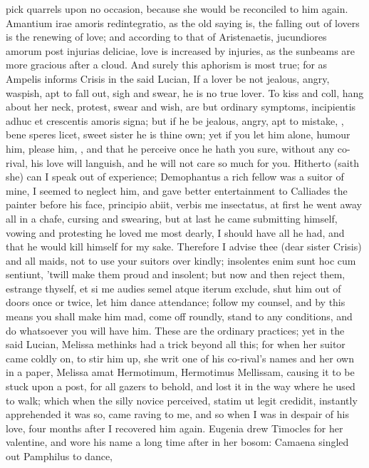 pick quarrels upon no occasion, because she would be reconciled to him
again. Amantium irae amoris redintegratio, as the old saying is, the
falling out of lovers is the renewing of love; and according to that of
Aristenaetis, jucundiores amorum post injurias deliciae, love is
increased by injuries, as the sunbeams are more gracious after a cloud.
And surely this aphorism is most true; for as Ampelis informs Crisis in
the said Lucian, If a lover be not jealous, angry, waspish, apt
to fall out, sigh and swear, he is no true lover. To kiss and coll,
hang about her neck, protest, swear and wish, are but ordinary
symptoms, incipientis adhuc et crescentis amoris signa; but if he be
jealous, angry, apt to mistake, \etc{}, bene speres licet, sweet sister he
is thine own; yet if you let him alone, humour him, please him, \etc{},
and that he perceive once he hath you sure, without any co-rival, his
love will languish, and he will not care so much for you. Hitherto
(saith she) can I speak out of experience; Demophantus a rich fellow
was a suitor of mine, I seemed to neglect him, and gave better
entertainment to Calliades the painter before his face, principio
abiit, verbis me insectatus, at first he went away all in a chafe,
cursing and swearing, but at last he came submitting himself, vowing
and protesting he loved me most dearly, I should have all he had, and
that he would kill himself for my sake. Therefore I advise thee (dear
sister Crisis) and all maids, not to use your suitors over kindly;
insolentes enim sunt hoc cum sentiunt, 'twill make them proud and
insolent; but now and then reject them, estrange thyself, et si me
audies semel atque iterum exclude, shut him out of doors once or twice,
let him dance attendance; follow my counsel, and by this means
you shall make him mad, come off roundly, stand to any
conditions, and do whatsoever you will have him. These are the ordinary
practices; yet in the said Lucian, Melissa methinks had a trick beyond
all this; for when her suitor came coldly on, to stir him up, she writ
one of his co-rival's names and her own in a paper, Melissa amat
Hermotimum, Hermotimus Mellissam, causing it to be stuck upon a post,
for all gazers to behold, and lost it in the way where he used to walk;
which when the silly novice perceived, statim ut legit credidit,
instantly apprehended it was so, came raving to me, \etc{} and so
when I was in despair of his love, four months after I recovered him
again. Eugenia drew Timocles for her valentine, and wore his name a
long time after in her bosom: Camaena singled out Pamphilus to dance,
